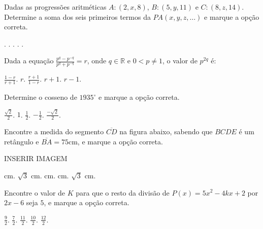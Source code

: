 \begin{question}%
Dadas as progressões aritméticas \(A: (2,x,8)\), \(B:(5,y,11)\) e \(C:(8,z,14)\). Determine a soma dos seis primeiros termos da \(PA(x,y,z, \ldots)\) e marque a opção correta.
    \begin{tasks}
        .
        .
        .
        .
        .
    \end{tasks}
\end{question}

\begin{question}%
Dada a equação \(\frac{p^q - p^{-q}}{p^q + p^{-q}} = r\), onde \(q \in \mathbb{R}\) e \(0 < p \neq 1\), o valor de \(p^{2q}\) é:
    \begin{tasks}
        \task \(\frac{1-r}{r+1}\).
        \task \(r\).
        \task \(\frac{r+1}{1-r}\).
        \task \(r+1\).
        \task \(r-1\).
    \end{tasks}
\end{question}

\begin{question}%
Determine o cosseno de \(1935^\circ\) e marque a opção correta.
    \begin{tasks}
        \task \(\frac{\sqrt{2}}{2}\).
        \task \(1\).
        \task \(\frac{1}{2}\).
        \task \(-\frac{1}{2}\).
        \task \(\frac{- \sqrt{2}}{2}\).
    \end{tasks}
\end{question}

\begin{question}%
Encontre a medida do segmento \(\overline{CD}\) na figura abaixo, sabendo que \(BCDE\) é um retângulo e \(\overline{BA} = 75\)cm, e marque a opção correta.

INSERIR IMAGEM
    \begin{tasks}
         cm.
        \(\sqrt{3}\) cm.
         cm.
         cm.
         \(\sqrt{3}\) cm.
    \end{tasks}
\end{question}

\begin{question}%
Encontre o valor de \(K\) para que o resto da divisão de \(P(x) = 5x^2 - 4kx + 2\) por \(2x-6\) seja \(5\), e marque a opção correta.
    \begin{tasks}
        \task \(\frac{9}{2}\).
        \task \(\frac{7}{2}\).
        \task \(\frac{11}{2}\).
        \task \(\frac{10}{2}\).
        \task \(\frac{12}{2}\).
    \end{tasks}
\end{question}

